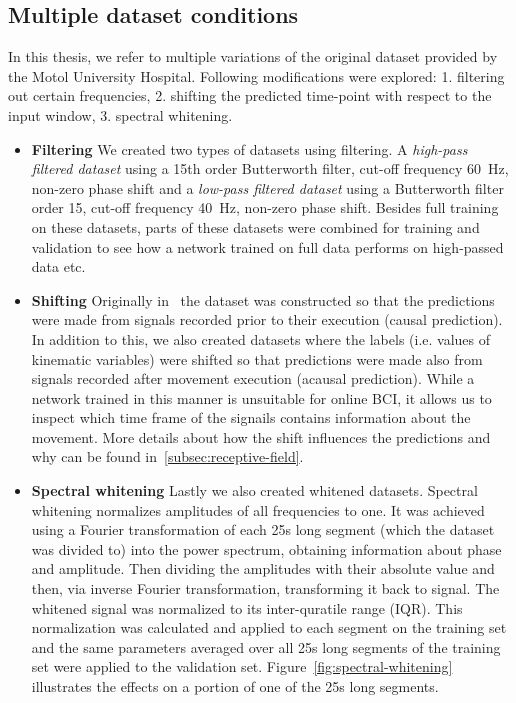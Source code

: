 \subsection{Multiple dataset conditions}\label{subsec:modifications-to-the-dataset}
In this thesis, we refer to multiple variations of the original dataset provided by the Motol University Hospital.
Following modifications were explored:
1. filtering out certain frequencies, 2. shifting the predicted time-point with respect to the input window, 3. spectral whitening.
\begin{itemize}
\item \textbf{Filtering} We created two types of datasets using filtering.
A \textit{high-pass filtered dataset} using a 15th order Butterworth filter, cut-off frequency 60~Hz, non-zero phase shift and a \textit{low-pass filtered dataset} using a Butterworth filter order 15, cut-off frequency 40~Hz, non-zero phase shift.
Besides full training on these datasets, parts of these datasets were combined for training and validation to see how a network trained on full data performs on high-passed data etc.
\\

\item \textbf{Shifting} Originally in~\cite{Hammer-2021} the dataset was constructed so that the predictions were made from signals recorded prior to their execution (causal prediction).
In addition to this, we also created datasets where the labels (i.e. values of kinematic variables) were shifted so that predictions were made also from signals recorded after movement execution (acausal prediction).
While a network trained in this manner is unsuitable for online BCI, it allows us to inspect which time frame of the signails contains information about the movement.
More details about how the shift influences the predictions and why can be found in~\ref{subsec:receptive-field}. \\

\item \textbf{Spectral whitening} Lastly we also created whitened datasets.
Spectral whitening normalizes amplitudes of all frequencies to one.
It was achieved using a Fourier transformation of each 25s long segment (which the dataset was divided to) into the power spectrum, obtaining information about phase and amplitude.
Then dividing the amplitudes with their absolute value and then, via inverse Fourier transformation, transforming it back to signal.
The whitened signal was normalized to its inter-quratile range (IQR).
This normalization was calculated and applied to each segment on the training set and the same parameters averaged over all 25s long segments of the training set were applied to the validation set.
Figure~\ref{fig:spectral-whitening} illustrates the effects on a portion of one of the 25s long segments.
\end{itemize}

